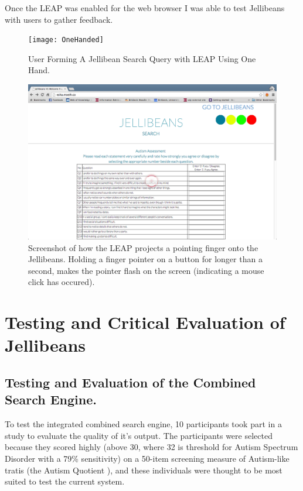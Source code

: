 \documentclass[a4paper, 11pt]{article}
\begin{document}
Once the LEAP was enabled for the web browser I was able to test Jellibeans with users to gather feedback. 

\begin{figure}[H]
\begin{center}
\texttt{[image: OneHanded]}
\caption{User Forming A Jellibean Search Query with LEAP Using One Hand.}
\label{OneHanded}
\end{center}
\end{figure}



\begin{figure}[H]
\begin{center}
\includegraphics[scale=0.25]{leapweb}
\caption{Screenshot of how the LEAP projects a pointing finger onto the Jellibeans. Holding a finger pointer on a button for longer than a second, makes the pointer flash on the screen (indicating a mouse click has occured).}
\label{LeapOnTheWebsite}
\end{center}
\end{figure}

\section{Testing and Critical Evaluation of Jellibeans}
\subsection{Testing and Evaluation of the Combined Search Engine.}
To test the integrated combined search engine, 10 participants took part in a study to evaluate the quality of it's output. The participants were selected because they scored highly (above 30, where 32 is threshold for Autism Spectrum Disorder with a 79\% sensitivity) on a 50-item screening measure of Autism-like tratis (the Autism Quotient \cite{Baron Cohen et al}), and these individuals were thought to be most suited to test the current system. 
\end{document}
